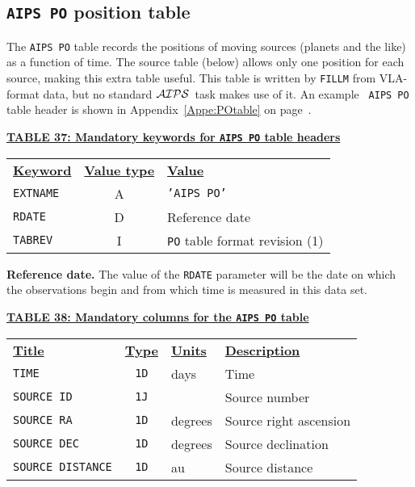 \documentclass[twoside]{article}
\newcommand{\AIPS}{{$\cal AIPS\/$}}
\begin{document}
\vfill\eject
\subsection{{\tt AIPS PO} position table}
\label{s:PO}

The {\tt AIPS PO} table records the positions of moving sources
(planets and the like) as a function of time.  The source table
(below) allows only one position for each source, making this extra
table useful.  This table is written by {\tt FILLM} from VLA-format
data, but no standard \AIPS\ task makes use of it.  An example {\tt
  AIPS PO} table header is shown in Appendix~\ref{Appe:POtable} on
page~\pageref{Appe:POtable}.

\begin{center}
\underline{\bf{TABLE 37: Mandatory keywords for {\tt AIPS PO} table
    headers}}\\
\begin{tabular}{lcl}
\noalign{\vspace{2pt}} \label{ta:POkeys}
\underline{{\bf Keyword}} & \underline{\bf{Value type}} &
    \underline{\bf{Value\vphantom{y}}} \\
\noalign{\vspace{2pt}}
{\tt EXTNAME}   & A & {\tt 'AIPS PO'}  \\
{\tt RDATE}     & D & Reference date \\
{\tt TABREV}    & I & {\tt PO} table format revision (1)
\end{tabular}
\end{center}

{\bf Reference date.} The value of the {\tt RDATE} parameter will be
the date on which the observations begin and from which time is
measured in this data set.

\begin{center}
\underline{\bf{TABLE 38: Mandatory columns for the {\tt AIPS PO} table}}\\
\begin{tabular}{lcll}
\noalign{\vspace{2pt}} \label{ta:POcols}
\underline{{\bf Title\vphantom{y}}} & \underline{\bf{Type}} &
   \underline{{\bf Units\vphantom{y}}} & \underline{\bf{Description}} \\
\noalign{\vspace{2pt}}
{\tt TIME}            & {\tt 1D} & days & Time \\
{\tt SOURCE ID}       & {\tt 1J} &      & Source number \\
{\tt SOURCE RA}       & {\tt 1D} & degrees & Source right ascension \\
{\tt SOURCE DEC}      & {\tt 1D} & degrees & Source declination \\
{\tt SOURCE DISTANCE} & {\tt 1D} & au      & Source distance
\end{tabular}
\end{center}
\end{document}
